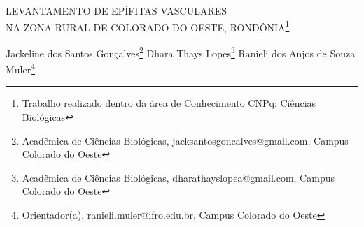 \documentclass[article,12pt,onesidea,4paper,english,brazil]{abntex2}
\begin{document}
	
	
	\frenchspacing 
	
	\begin{center}
		\LARGE LEVANTAMENTO DE EPÍFITAS VASCULARES\\ NA ZONA RURAL DE COLORADO DO OESTE, RONDÔNIA\footnote{Trabalho realizado dentro da área de Conhecimento CNPq: Ciências Biológicas}
		
		\normalsize
		Jackeline dos Santos Gonçalves\footnote{Acadêmica de Ciências Biológicas, jacksantosgoncalves@gmail.com, Campus Colorado do Oeste} 
		Dhara Thays Lopes\footnote{Acadêmica de Ciências Biológicas, dharathayslopea@gmail.com, Campus Colorado do Oeste} 
		Ranieli dos Anjos de Souza Muler\footnote{Orientador(a), ranieli.muler@ifro.edu.br, Campus Colorado do Oeste} 
		
	\end{center}
	
\end{document}
